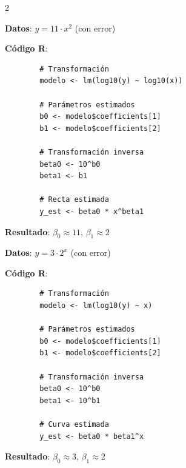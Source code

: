 \documentclass[10pt,a4paper]{article}
\begin{document}
\begin{multicols}{2}
    \begin{tcolorbox}[title=Ejemplo: Modelo Potencial, equal height group=RL5]
        \textbf{Datos}: $y = 11 \cdot x^2$ (con error)
        
        \textbf{Código R}:
        \begin{verbatim}
        # Transformación
        modelo <- lm(log10(y) ~ log10(x))
        
        # Parámetros estimados
        b0 <- modelo$coefficients[1]
        b1 <- modelo$coefficients[2]
        
        # Transformación inversa
        beta0 <- 10^b0
        beta1 <- b1
        
        # Recta estimada
        y_est <- beta0 * x^beta1
        \end{verbatim}
        
        \textbf{Resultado}: $\beta_0 \approx 11$, $\beta_1 \approx 2$
    \end{tcolorbox}
    \begin{tcolorbox}[title=Ejemplo: Modelo Exponencial, equal height group=RL5]
        \textbf{Datos}: $y = 3 \cdot 2^x$ (con error)
        
        \textbf{Código R}:
        \begin{verbatim}
        # Transformación
        modelo <- lm(log10(y) ~ x)
        
        # Parámetros estimados
        b0 <- modelo$coefficients[1]
        b1 <- modelo$coefficients[2]
        
        # Transformación inversa
        beta0 <- 10^b0
        beta1 <- 10^b1
        
        # Curva estimada
        y_est <- beta0 * beta1^x
        \end{verbatim}
        
        \textbf{Resultado}: $\beta_0 \approx 3$, $\beta_1 \approx 2$
    \end{tcolorbox}
\end{multicols}
\end{document}
